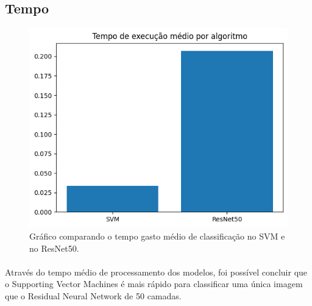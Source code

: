 \documentclass[12pt]{article}
\begin{document}
\subsection{Tempo}

\begin{figure}
    \centering
    \includegraphics{ResNet50 vs SVM media.png}
    \caption{Gráfico comparando o tempo gasto médio de classificação no SVM e no ResNet50.}
    \label{fig:grafico-svm-vs-resnet-tempo}
\end{figure}

\paragraph{}Através do tempo médio de processamento dos modelos, foi possível concluir que o Supporting Vector Machines é mais rápido para classificar uma única imagem que o Residual Neural Network de 50 camadas.
\end{document}
